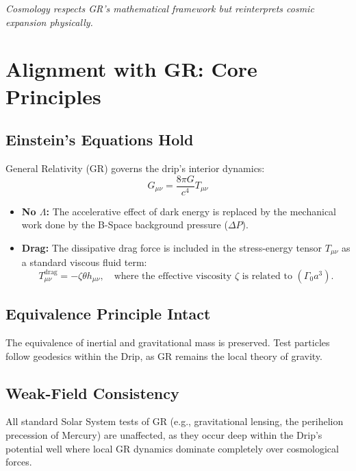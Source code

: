 \documentclass{BSpacePaper} %
\begin{document}
\makeBSCSsupplementtitle

\begin{center}
    \textit{\bspace{} Cosmology respects GR's mathematical framework but reinterprets cosmic expansion physically.}
\end{center}
\vspace{1em}

\section{Alignment with GR: Core Principles}

\subsection{Einstein’s Equations Hold}
General Relativity (GR) governs the drip’s interior dynamics:
\begin{equation}
    G_{\mu\nu} = \frac{8\pi G}{c^4} T_{\mu\nu}
\end{equation}
\begin{itemize}
    \item \textbf{No \(\Lambda\):} The accelerative effect of dark energy is replaced by the mechanical work done by the B-Space background pressure (\(\Delta P\)).
    \item \textbf{Drag:} The dissipative drag force is included in the stress-energy tensor \(T_{\mu\nu}\) as a standard viscous fluid term:
    \begin{equation}
        T_{\mu\nu}^{\text{drag}} = -\zeta \theta h_{\mu\nu}, \quad \text{where the effective viscosity } \zeta \text{ is related to } (\Gamma_0 a^3).
    \end{equation}
\end{itemize}

\subsection{Equivalence Principle Intact}
The equivalence of inertial and gravitational mass is preserved. Test particles follow geodesics within the Drip, as GR remains the local theory of gravity.

\subsection{Weak-Field Consistency}
All standard Solar System tests of GR (e.g., gravitational lensing, the perihelion precession of Mercury) are unaffected, as they occur deep within the Drip's potential well where local GR dynamics dominate completely over cosmological forces.
\end{document}
